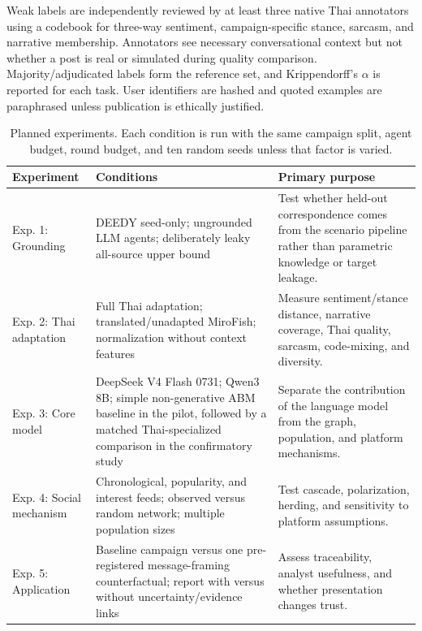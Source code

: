 \documentclass[conference]{IEEEtran}
\begin{document}
Weak labels are independently reviewed by at least three native Thai
annotators using a codebook for three-way sentiment, campaign-specific stance,
sarcasm, and narrative membership. Annotators see necessary conversational
context but not whether a post is real or simulated during quality comparison.
Majority/adjudicated labels form the reference set, and Krippendorff's
$\alpha$ is reported for each task. User identifiers are hashed and quoted
examples are paraphrased unless publication is ethically justified.

\begin{table}[t]
\caption{Planned experiments. Each condition is run with the same campaign
split, agent budget, round budget, and ten random seeds unless that factor is
varied.}
\label{tab:experiments}
\centering
\footnotesize
\begin{tabular}{@{}p{}p{}p{}@{}}
\toprule
Experiment & Conditions & Primary purpose \\
\midrule
Exp. 1: Grounding & DEEDY seed-only; ungrounded LLM agents; deliberately leaky
all-source upper bound & Test whether held-out correspondence comes from the
scenario pipeline rather than parametric knowledge or target leakage. \\
Exp. 2: Thai adaptation & Full Thai adaptation; translated/unadapted MiroFish;
normalization without context features & Measure sentiment/stance distance,
narrative coverage, Thai quality, sarcasm, code-mixing, and diversity. \\
Exp. 3: Core model & DeepSeek V4 Flash 0731; Qwen3 8B; simple non-generative
ABM baseline in the pilot, followed by a matched Thai-specialized comparison
in the confirmatory study & Separate the contribution of the language model
from the graph, population, and platform mechanisms. \\
Exp. 4: Social mechanism & Chronological, popularity, and interest feeds;
observed versus random network; multiple population sizes & Test cascade,
polarization, herding, and sensitivity to platform assumptions. \\
Exp. 5: Application & Baseline campaign versus one pre-registered
message-framing
counterfactual; report with versus without uncertainty/evidence links & Assess
traceability, analyst usefulness, and whether presentation changes trust. \\
\bottomrule
\end{tabular}
\end{table}
\end{document}
